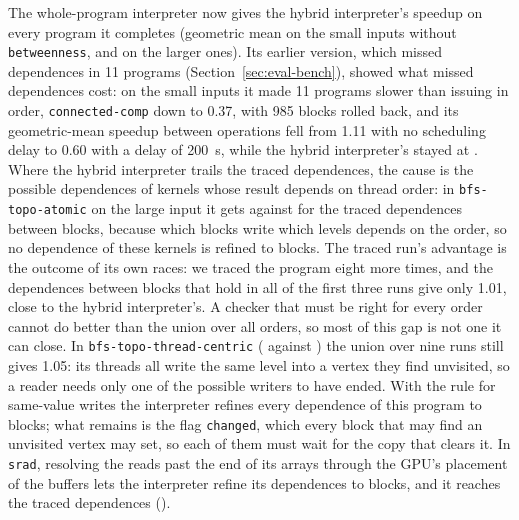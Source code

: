 \documentclass[11pt]{article}
\newcommand{\secref}[1]{Section~\ref{#1}}
\newcommand{\code}[1]{\texttt{#1}}
\begin{document}
\begin{table}[tbp]
\centering
\footnotesize
\setlength{\tabcolsep}{4pt}

\caption{The hybrid interpreter with dependences between operations and between blocks: the lockstep run without
and with recording which block made each reference (on the same built program), the refinement to blocks from the
four orders' references, and the dependences each gives, over the \numSimSmallPrograms{} and
\numSimLargePrograms{} benchmarks. GraphBIG's \code{betweenness} was measured alone, the others eight at a time, and
the four-order rows leave it out.}
\label{tab:block-cost}
\end{table}

The whole-program interpreter now gives the hybrid interpreter's speedup on every program it completes (geometric
mean \numSimSmallFu{} on the small inputs without \code{betweenness}, and \numSimLargeFu{} on the larger ones). Its
earlier version, which missed dependences in 11 programs (\secref{sec:eval-bench}), showed what missed dependences
cost: on the small inputs it made 11 programs slower than issuing in order, \code{connected-comp} down to 0.37,
with 985 blocks rolled back, and its geometric-mean speedup between operations fell from 1.11 with no scheduling
delay to 0.60 with a delay of 200~\textmu s, while the hybrid interpreter's stayed at \numSimDelayHyNone{}. Where the hybrid interpreter trails the traced dependences,
the cause is the possible dependences of kernels whose result depends on thread order: in \code{bfs-topo-atomic}
on the large input it gets \numSimLargeAtomicHyBlk{} against \numSimLargeAtomicTrBlk{} for the traced
dependences between blocks, because which blocks write which levels depends on the order, so no dependence of
these kernels is refined to blocks. The traced run's advantage is the outcome of its own races: we traced the
program eight more times, and the dependences between blocks that hold in all of the first three runs give only
1.01, close to the hybrid interpreter's. A checker that must be right for every order cannot do better than the
union over all orders, so most of this gap is not one it can close. In \code{bfs-topo-thread-centric}
(\numSimLargeTopoHyBlk{} against \numSimLargeTopoTrBlk{}) the union over nine runs still gives 1.05: its threads all
write the same level into a vertex they find unvisited, so a reader needs only one of the possible writers to have
ended. With the rule for same-value writes the interpreter refines every dependence of this program to blocks; what
remains is the flag \code{changed}, which every block that may find an unvisited vertex may set, so each of them
must wait for the copy that clears it. In \code{srad}, resolving the reads past the end of its arrays through the
GPU's placement of the buffers lets the interpreter refine its dependences to blocks, and it reaches the traced
dependences (\numSimLargeSradHyBlk{}).
\end{document}
